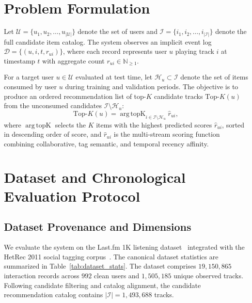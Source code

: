\documentclass[conference]{IEEEtran}
\begin{document}
\section{Problem Formulation}
Let $\mathcal{U} = \{u_1, u_2, \dots, u_{|\mathcal{U}|}\}$ denote the set of users and $\mathcal{I} = \{i_1, i_2, \dots, i_{|\mathcal{I}|}\}$ denote the full candidate item catalog. The system observes an implicit event log $\mathcal{D} = \{(u, i, t, r_{ui})\}$, where each record represents user $u$ playing track $i$ at timestamp $t$ with aggregate count $r_{ui} \in \mathbb{N}_{\ge 1}$.

For a target user $u \in \mathcal{U}$ evaluated at test time, let $\mathcal{H}_u \subset \mathcal{I}$ denote the set of items consumed by user $u$ during training and validation periods. The objective is to produce an ordered recommendation list of top-$K$ candidate tracks $\text{Top-}K(u)$ from the unconsumed candidates $\mathcal{I} \setminus \mathcal{H}_u$:
\begin{equation}
\text{Top-}K(u) = \operatorname{arg\,topK}_{i \in \mathcal{I} \setminus \mathcal{H}_u} \hat{r}_{ui},
\end{equation}
where $\operatorname{arg\,topK}$ selects the $K$ items with the highest predicted scores $\hat{r}_{ui}$, sorted in descending order of score, and $\hat{r}_{ui}$ is the multi-stream scoring function combining collaborative, tag semantic, and temporal recency affinity.

\section{Dataset and Chronological Evaluation Protocol}
\subsection{Dataset Provenance and Dimensions}
We evaluate the system on the Last.fm 1K listening dataset~\cite{celma2008music} integrated with the HetRec 2011 social tagging corpus~\cite{cantador2011hetrec}. The canonical dataset statistics are summarized in Table~\ref{tab:dataset_stats}. The dataset comprises $19,150,865$ interaction records across $992$ clean users and $1,505,185$ unique observed tracks. Following candidate filtering and catalog alignment, the candidate recommendation catalog contains $|\mathcal{I}| = 1,493,688$ tracks.
\end{document}
